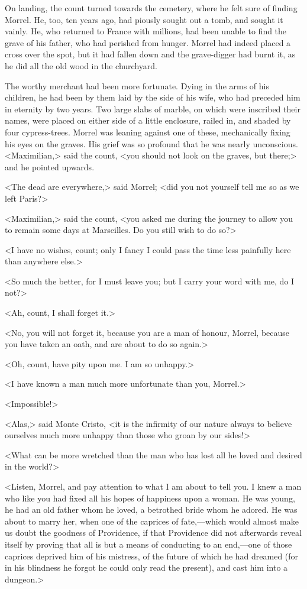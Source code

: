  On landing, the count turned towards the cemetery, where he felt sure of finding Morrel. He, too, ten years ago, had piously sought out a tomb, and sought it vainly. He, who returned to France with millions, had been unable to find the grave of his father, who had perished from hunger. Morrel had indeed placed a cross over the spot, but it had fallen down and the grave-digger had burnt it, as he did all the old wood in the churchyard. 

 The worthy merchant had been more fortunate. Dying in the arms of his children, he had been by them laid by the side of his wife, who had preceded him in eternity by two years. Two large slabs of marble, on which were inscribed their names, were placed on either side of a little enclosure, railed in, and shaded by four cypress-trees. Morrel was leaning against one of these, mechanically fixing his eyes on the graves. His grief was so profound that he was nearly unconscious.  <Maximilian,> said the count, <you should not look on the graves, but there;> and he pointed upwards. 

 <The dead are everywhere,> said Morrel; <did you not yourself tell me so as we left Paris?> 

 <Maximilian,> said the count, <you asked me during the journey to allow you to remain some days at Marseilles. Do you still wish to do so?> 

 <I have no wishes, count; only I fancy I could pass the time less painfully here than anywhere else.> 

 <So much the better, for I must leave you; but I carry your word with me, do I not?> 

 <Ah, count, I shall forget it.> 

 <No, you will not forget it, because you are a man of honour, Morrel, because you have taken an oath, and are about to do so again.> 

 <Oh, count, have pity upon me. I am so unhappy.> 

 <I have known a man much more unfortunate than you, Morrel.> 

 <Impossible!> 

 <Alas,> said Monte Cristo, <it is the infirmity of our nature always to believe ourselves much more unhappy than those who groan by our sides!> 

 <What can be more wretched than the man who has lost all he loved and desired in the world?> 

 <Listen, Morrel, and pay attention to what I am about to tell you. I knew a man who like you had fixed all his hopes of happiness upon a woman. He was young, he had an old father whom he loved, a betrothed bride whom he adored. He was about to marry her, when one of the caprices of fate,—which would almost make us doubt the goodness of Providence, if that Providence did not afterwards reveal itself by proving that all is but a means of conducting to an end,—one of those caprices deprived him of his mistress, of the future of which he had dreamed (for in his blindness he forgot he could only read the present), and cast him into a dungeon.> 

